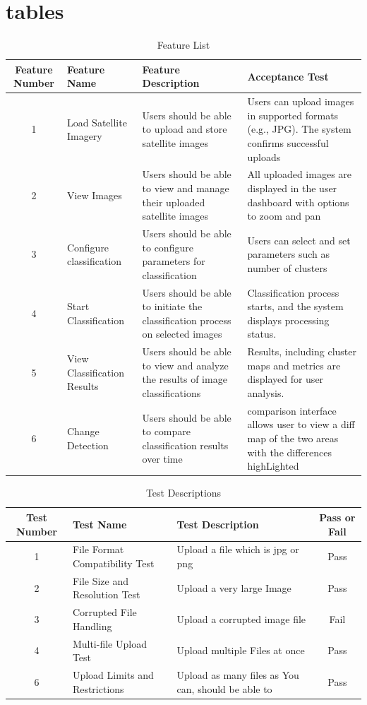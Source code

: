 \section{tables}\label{sec:tables}

\begin{table}[ht]
\centering
\caption{Feature List}
\begin{tabular}{|c|p{3cm}|p{4cm}|p{4cm}|}
\hline
\textbf{Feature Number} & \textbf{Feature Name} & \textbf{Feature Description} & \textbf{Acceptance Test} \\ \hline
1 & Load Satellite Imagery & Users should be able to upload and store satellite images & Users can upload images in supported formats (e.g., JPG). The system confirms successful uploads  \\ \hline
2 & View Images & Users should be able to view and manage their uploaded satellite images & All uploaded images are displayed in the user dashboard with options to zoom and pan\\ \hline
3 & Configure classification & Users should be able to configure parameters for classification & Users can select and set parameters such as number of clusters\\ \hline
4 & Start Classification & Users should be able to initiate the classification process on selected images & Classification process starts, and the system displays processing status.\\ \hline
5 & View Classification Results & Users should be able to view and analyze the results of image classifications & Results, including cluster maps and metrics are displayed for user analysis. \\ \hline
6 & Change Detection & Users should be able to compare classification results over time & comparison interface allows user to view a diff map of the two areas with the differences highLighted\\ \hline
\end{tabular}\label{tab:1}
\end{table}


\begin{table}[ht]
\centering
\caption{Test Descriptions}
\begin{tabular}{|c|p{3cm}|p{5cm}|c|}
\hline
\textbf{Test Number} & \textbf{Test Name} & \textbf{Test Description} & \textbf{Pass or Fail} \\ \hline
1 & File Format Compatibility Test & Upload a file which is jpg or png & Pass \\ \hline
2 & File Size and Resolution Test & Upload a very large Image & Pass \\ \hline
3 & Corrupted File Handling & Upload a corrupted image file & Fail \\ \hline
4 & Multi-file Upload Test & Upload multiple Files at once & Pass \\ \hline
6 & Upload Limits and Restrictions & Upload as many files as You can, should be able to & Pass \\ \hline
\hline
\end{tabular}\label{tab:2}
\end{table}